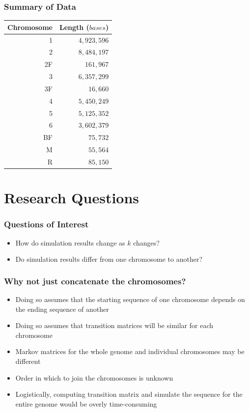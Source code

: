 \documentclass[xcolor=dvipsnames]{beamer} \usepackage{beamerthemesplit}
\newcommand{\ra}[1]{\renewcommand{\arraystretch}{#1}}
\begin{document}
\begin{frame}
	\frametitle{Summary of Data}
	
	\begin{table}
	\centering
	\ra{1}
	\label{tab:data}
	\begin{tabular} {@{}rr@{}} 
	\toprule
	Chromosome & Length ($bases$)\\
	\midrule
	1 & $4,923,596$\\
	2 & $8,484,197$\\
	2F & $161,967$\\
	3 & $6,357,299$\\
	3F & $16,660$\\
	4 & $5,450,249$\\
	5 & $5,125,352$\\
	6 & $3,602,379$\\
	BF & $75,732$\\	
	M & $55,564$\\
	R & $85,150$\\
	\bottomrule
	\end{tabular} 
	\end{table}

\end{frame}


\section{Research Questions}

\begin{frame}
	\frametitle{Questions of Interest}
    \begin{itemize}
    \item How do simulation results change as $k$ changes?
    \item Do simulation results differ from one chromosome to another?
    \end{itemize}
\end{frame}

\begin{frame}
	\frametitle{Why not just concatenate the chromosomes?}
    \begin{itemize}
    	\item Doing so assumes that the starting sequence of one chromosome depends on the ending sequence of another
    	\item Doing so assumes that transition matrices will be similar for each chromosome
        \item Markov matrices for the whole genome and individual chromosomes may be different
        \item Order in which to join the chromosomes is unknown 
        \item Logistically, computing transition matrix and simulate the sequence for the entire genome would be overly time-consuming
    \end{itemize}
\end{frame}
\end{document}
